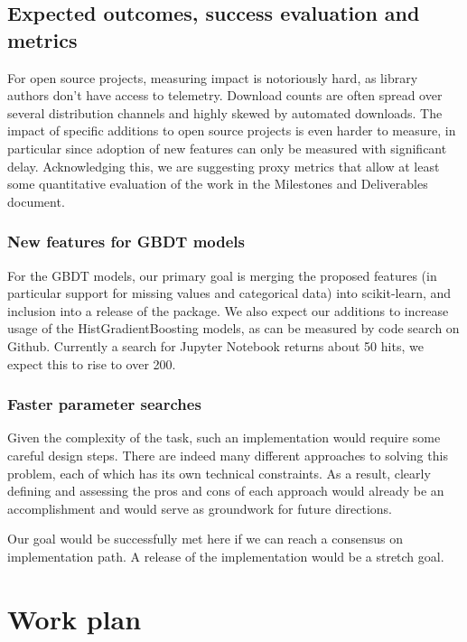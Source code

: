 \documentclass[11pt]{article}  %
\begin{document}
\subsection{Expected outcomes, success evaluation and metrics}
For open source projects, measuring impact is notoriously hard, as library authors don't have access to telemetry. Download counts are often spread over several distribution channels and highly skewed by automated downloads. The impact of specific additions to open source projects is even harder to measure, in particular since adoption of new features can only be measured with significant delay. Acknowledging this, we are suggesting proxy metrics that allow at least some quantitative evaluation of the work in the Milestones and Deliverables document.

\subsubsection{New features for GBDT models}

For the GBDT models, our primary goal is merging the proposed
features (in particular support for missing values and categorical data) into scikit-learn, and inclusion into a release of the package. We also expect our additions to increase usage of the HistGradientBoosting models, as can be measured by code search on Github. Currently a search for Jupyter Notebook returns about 50 hits, we expect this to rise to over 200.

\subsubsection{Faster parameter searches}

Given the complexity of the
task, such an implementation would require some careful design steps. There
are indeed many different approaches to solving this problem, each of which
has its own technical constraints. As a result, clearly defining and
assessing the pros and cons of each approach would already be an
accomplishment and would serve as groundwork for future directions.

Our goal would be successfully met here if we can reach a consensus on implementation path. A release of the implementation would be a stretch goal.

\section{Work plan}
\end{document}
